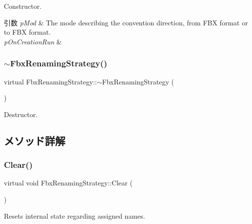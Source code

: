 Constructor. 
\begin{DoxyParams}{引数}
{\em p\+Mod} & The mode describing the convention direction, from F\+BX format or to F\+BX format. \\
\hline
{\em p\+On\+Creation\+Run} & \\
\hline
\end{DoxyParams}
\mbox{\label{class_fbx_renaming_strategy_a3d041932b649c5b69b29d156574bece1}} 
\subsubsection{\texorpdfstring{$\sim$\+Fbx\+Renaming\+Strategy()}{~FbxRenamingStrategy()}}
{\footnotesize\ttfamily virtual Fbx\+Renaming\+Strategy\+::$\sim$\+Fbx\+Renaming\+Strategy (\begin{DoxyParamCaption}{ }\end{DoxyParamCaption})\hspace{0.3cm}{\ttfamily [virtual]}}



Destructor. 



\subsection{メソッド詳解}
\mbox{\label{class_fbx_renaming_strategy_a87b1e89413d7b8c86a9d8a9f6fa6490f}} 
\subsubsection{\texorpdfstring{Clear()}{Clear()}}
{\footnotesize\ttfamily virtual void Fbx\+Renaming\+Strategy\+::\+Clear (\begin{DoxyParamCaption}{ }\end{DoxyParamCaption})\hspace{0.3cm}{\ttfamily [virtual]}}



Resets internal state regarding assigned names. 




